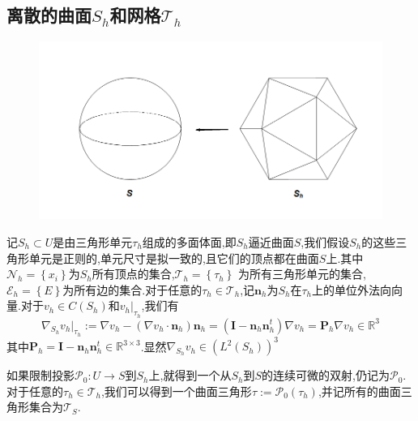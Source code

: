 \documentclass{article}
\begin{document}
\subsection{离散的曲面$S_h$和网格$\mathcal{T}_h$}
\begin{figure}[H]
\centering
\includegraphics[scale=0.5]{./figures/picture_1.png}
\caption{}
\end{figure}
记$S_h\subset U$是由三角形单元$\tau_h$组成的多面体面,即$S_h$逼近曲面$S$,我们假设$S_h$的这些三角形单元是正则的,单元尺寸是拟一致的,且它们的顶点都在曲面$S$上.其中$\mathcal{N}_h=\left\{x_i\right\}$为$S_h$所有顶点的集合,$\mathcal{T}_h=\left\{\tau_h\right\}$ 为所有三角形单元的集合,$\mathcal{E}_h=\left\{E\right\}$为所有边的集合.对于任意的$\tau_h\in\mathcal{T}_h$,记$\boldsymbol{n}_h$为$S_h$在$\tau_h$上的单位外法向向量.对于$v_h\in C(S_h)$和$v_h|_{\tau_h}$,我们有
\begin{equation*}
\nabla_{S_h}v_h|_{\tau_h}:=\nabla v_h-(\nabla v_h\cdot\boldsymbol{n}_h)\boldsymbol{n}_h=(\boldsymbol{I}-\boldsymbol{n}_h\boldsymbol{n}^t_h)\nabla v_h=\boldsymbol{P}_h\nabla v_h\in\mathbb{R}^3
\end{equation*}
其中$\boldsymbol{P}_h=\boldsymbol{I}-\boldsymbol{n}_h\boldsymbol{n}^t_h\in\mathbb{R}^{3\times 3}$.显然$\nabla_{S_h}v_h\in(L^2(S_h))^3$

如果限制投影$\mathcal{P}_0:U\rightarrow S$到$S_h$上,就得到一个从$S_h$到$S$的连续可微的双射,仍记为$\mathcal{P}_0$.对于任意的$\tau_h\in\mathcal{T}_h$,我们可以得到一个曲面三角形$\tau:=\mathcal{P}_0(\tau_h)$,并记所有的曲面三角形集合为$\mathcal{T}_S$.
\end{document}

